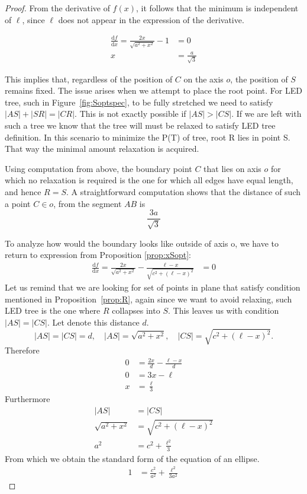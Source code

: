 \documentclass[openany]{book}
\newcommand{\Ptotal}[1]{P(#1)}
\begin{document}
\begin{proof}
	From the derivative of \( f(x) \), it follows that the minimum is independent of \( \ell \), since \( \ell \) does not appear in the expression of the derivative.
		
	\begin{align*}
		\frac{\mathrm{d}f}{\mathrm{d}x}
		= \frac{2x}{\sqrt{a^{2} + x^{2}}} - 1 &= 0 \\
		x &= \frac{a}{\sqrt{3}}
	\end{align*}
	
	This implies that, regardless of the position of \( C \) on the axis \( o \), the position of \( S \) remains fixed.
	The issue arises when we attempt to place the root point. For LED tree, such in Figure~\ref{fig:Soptspec}, to be fully stretched we need to satisfy \(|AS|+|SR|=|CR|\). This is not exactly possible if \(|AS|>|CS|\). If we are left with such a tree we know that the tree will must be relaxed to satisfy LED tree definition. In this scenario to minimize the  \Ptotal{T} of tree, root R lies in point S. That way the minimal amount relaxation is acquired.
	
	Using computation from above, the boundary point \( C \) that lies on axis \(o\) for which no relaxation is required is the one for which all edges have equal length, and hence \( R = S \).
	A straightforward computation shows that the distance of such a point \(C \in o\), from the segment \( AB \) is
	\[ \frac{3 a}{\sqrt{3}} \]
	
	To analyze how would the boundary looks like outside of axis o, we have to return to expression from Proposition \ref{prop:xSopt}:
	\begin{align*}
		\frac{\mathrm{d}f}{\mathrm{d}x}
		= \frac{2x}{\sqrt{a^{2} + x^{2}}}
		- \frac{\ell - x}{\sqrt{c^{2} + (\ell - x)^{2}}} &=0
	\end{align*}
	Let us remind that we are looking for set of points in plane that satisfy condition mentioned in Proposition~\ref{prop:R}, again since we want to avoid relaxing, such LED tree is the one where \(R\) collapses into \(S\). This leaves us with condition \(|AS|=|CS|\). Let denote this distance \(d\).
		\[
		|AS| = |CS| = d, \quad
		|AS| = \sqrt{a^{2} + x^{2}}, \quad
		|CS| = \sqrt{c^{2} + (\ell - x)^{2}}.
		\]
	Therefore
	\begin{align*}
		0 &= \frac{2x}{d} - \frac{\ell - x}{d} \\
		0 &= 3x - \ell \\
		x &= \frac{\ell}{3} 
	\end{align*}
	Furthermore
	\begin{align*}
		|AS| &= |CS| \\
		\sqrt{a^{2} + x^{2}} &= \sqrt{c^{2} + (\ell - x)^{2}} \\
		a^2 &= c^2 + \frac{\ell^2}{3} 
	\end{align*} 
	From which we obtain the standard form of the equation of an ellipse.
	\begin{align*}
		1 &= \frac{c^2}{a^2} + \frac{\ell^2}{3 a^2} 
	\end{align*} 


\end{proof}
\end{document}

